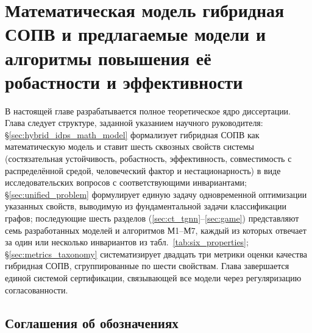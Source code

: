 
\chapter{Математическая модель гибридная СОПВ и предлагаемые модели и алгоритмы повышения её робастности и эффективности}
\label{ch:methods}

В настоящей главе разрабатывается полное теоретическое ядро
диссертации. Глава следует структуре, заданной указанием научного
руководителя: \S\ref{sec:hybrid_idps_math_model} формализует
гибридная СОПВ как математическую модель и ставит шесть сквозных свойств
системы (состязательная устойчивость, робастность, эффективность,
совместимость с распределённой средой, человеческий фактор и
нестационарность) в виде исследовательских вопросов с
соответствующими инвариантами; \S\ref{sec:unified_problem} формулирует
единую задачу одновременной оптимизации указанных свойств, выводимую
из фундаментальной задачи классификации графов; последующие шесть
разделов (\ref{sec:ct_tgnn}--\ref{sec:game}) представляют
семь разработанных моделей и алгоритмов М1--М7, каждый из которых
отвечает за один или несколько инвариантов из
табл.~\ref{tab:six_properties}; \S\ref{sec:metrics_taxonomy}
систематизирует двадцать три метрики оценки качества гибридная СОПВ,
сгруппированные по шести свойствам. Глава завершается единой системой
сертификации, связывающей все модели через регуляризацию
согласованности.

\section*{Соглашения об обозначениях}
\label{sec:notation_conventions}

